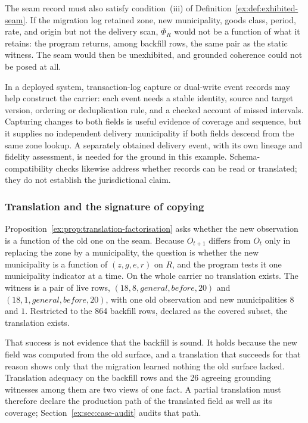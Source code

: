 \documentclass[smallextended,envcountsect,envcountsame,natbib]{svjour3}
\begin{document}
The seam record must also satisfy condition~(iii) of Definition~\ref{ex:def:exhibited-seam}. If the migration log retained zone, new municipality, goods class, period, rate, and origin but not the delivery scan, $\Phi_R$ would not be a function of what it retains: the program returns, among backfill rows, the same pair as the static witness. The seam would then be unexhibited, and grounded coherence could not be posed at all.

In a deployed system, transaction-log capture or dual-write event records may help construct the carrier: each event needs a stable identity, source and target version, ordering or deduplication rule, and a checked account of missed intervals. Capturing changes to both fields is useful evidence of coverage and sequence, but it supplies no independent delivery municipality if both fields descend from the same zone lookup. A separately obtained delivery event, with its own lineage and fidelity assessment, is needed for the ground in this example. Schema-compatibility checks likewise address whether records can be read or translated; they do not establish the jurisdictional claim.

\subsubsection{Translation and the signature of copying}

Proposition~\ref{ex:prop:translation-factorisation} asks whether the new observation is a function of the old one on the seam. Because $O_{t+1}$ differs from $O_t$ only in replacing the zone by a municipality, the question is whether the new municipality is a function of $(z,g,e,r)$ on $R$, and the program tests it one municipality indicator at a time. On the whole carrier no translation exists. The witness is a pair of live rows, $(18,8,\mathit{general},\mathit{before},20)$ and $(18,1,\mathit{general},\mathit{before},20)$, with one old observation and new municipalities $8$ and $1$. Restricted to the 864 backfill rows, declared as the covered subset, the translation exists.

That success is not evidence that the backfill is sound. It holds because the new field was computed from the old surface, and a translation that succeeds for that reason shows only that the migration learned nothing the old surface lacked. Translation adequacy on the backfill rows and the 26 agreeing grounding witnesses among them are two views of one fact. A partial translation must therefore declare the production path of the translated field as well as its coverage; Section~\ref{ex:sec:case-audit} audits that path.
\end{document}
